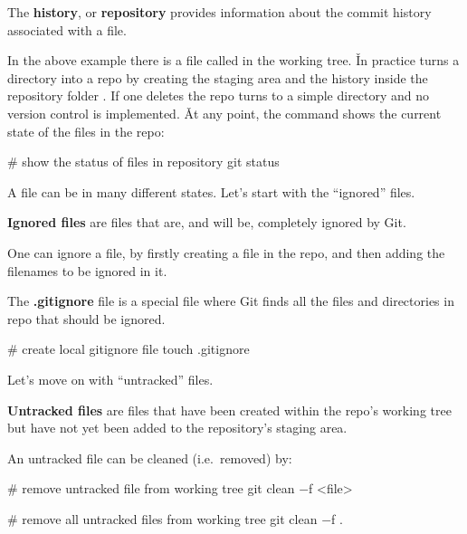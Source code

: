 The \textbf{history}, or \textbf{repository} provides information about the commit history associated with a file.
\ed


In the above example there is a file called  in the working tree. \v

In practice  turns a directory into a repo by creating the staging area and the history inside the
repository folder . If one deletes  the repo turns to a simple directory and no version control
is implemented. \v

At any point, the  command shows the current state of the files in the repo:

\begin{bash}
# show the status of files in repository
git status
\end{bash}

A file can be in many different states. Let’s start with the ``ignored'' files.

\textbf{Ignored files} are files that are, and will be, completely ignored by Git.
\ed

One can ignore a file, by firstly creating a  file in the repo, and then adding the filenames to be
ignored in it.

\bd[.gitignore]
The \textbf{.gitignore} file is a special file where Git finds all the files and directories in repo that should be
ignored.
\ed

\begin{bash}
# create local gitignore file
touch .gitignore
\end{bash}

Let's move on with ``untracked'' files.

\textbf{Untracked files} are files that have been created within the repo's working tree but have not yet been added
to the repository's staging area.
\ed

An untracked file can be cleaned (i.e.\ removed) by:

\begin{bash}
# remove untracked file from working tree
git clean $-$f <file>
\end{bash}

\begin{bash}
# remove all untracked files from working tree
git clean $-$f .
\end{bash}

